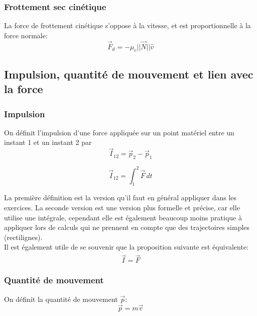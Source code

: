 \documentclass{article}
\numberwithin{equation}{section}
\begin{document}
\subsubsection{Frottement sec cinétique}
La force de frottement cinétique s'oppose à la vitesse, et est proportionnelle à la force normale:
\begin{equation}
	\boxed{ \vec F_d = - \mu_c ||\vec N|| \hat v }
\end{equation}

\subsection{Impulsion, quantité de mouvement et lien avec la force}

\subsubsection{Impulsion}
On définit l'impulsion d'une force appliquée sur un point matériel entre un instant 1 et un instant 2 par
\begin{equation}
	\boxed{ \vec I_{12} = \vec p_2 - \vec p_1 }
\end{equation}

\begin{equation}
	\boxed{ \vec I_{12} = \int_1^2 \vec F \, dt }
\end{equation}

La première définition est la version qu'il faut en général appliquer dans les exercices. La seconde version est une version plus formelle et précise, car elle utilise une intégrale, cependant elle est également beaucoup moins pratique à appliquer lors de calculs qui ne prennent en compte que des trajectoires simples (rectilignes). \\

Il est également utile de se souvenir que la proposition suivante est équivalente:
\begin{equation}
	\boxed{ \dot{\vec{I}} = \vec F }
\end{equation}

\subsubsection{Quantité de mouvement}
On définit la quantité de mouvement \(\vec p\):
\begin{equation} \label{eq:defquantitemouvement}
	\boxed{ \vec p = m \vec v }
\end{equation}
\end{document}
